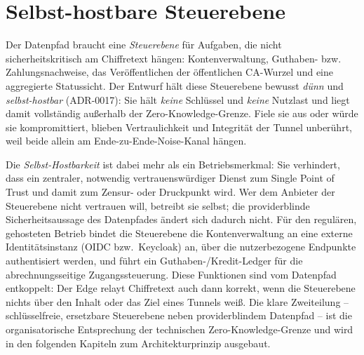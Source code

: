 \section{Selbst-hostbare Steuerebene}
\label{sec:controlplane}

Der Datenpfad braucht eine \emph{Steuerebene} für Aufgaben, die nicht
sicherheitskritisch am Chiffretext hängen: Kontenverwaltung, Guthaben- bzw.
Zahlungsnachweise, das Veröffentlichen der öffentlichen CA-Wurzel und eine
aggregierte Statussicht. Der Entwurf hält diese Steuerebene bewusst
\emph{dünn} und \emph{selbst-hostbar} (ADR-0017): Sie hält \emph{keine}
Schlüssel und \emph{keine} Nutzlast und liegt damit vollständig außerhalb der
Zero-Knowledge-Grenze. Fiele sie aus oder würde sie kompromittiert, blieben
Vertraulichkeit und Integrität der Tunnel unberührt, weil beide allein am
Ende-zu-Ende-Noise-Kanal hängen.

Die \emph{Selbst-Hostbarkeit} ist dabei mehr als ein Betriebsmerkmal: Sie
verhindert, dass ein zentraler, notwendig vertrauenswürdiger Dienst zum
Single Point of Trust und damit zum Zensur- oder Druckpunkt wird. Wer dem
Anbieter der Steuerebene nicht vertrauen will, betreibt sie selbst; die
providerblinde Sicherheitsaussage des Datenpfades ändert sich dadurch nicht.
Für den regulären, gehosteten Betrieb bindet die Steuerebene die
Kontenverwaltung an eine externe Identitätsinstanz (OIDC bzw.\ Keycloak) an,
über die nutzerbezogene Endpunkte authentisiert werden, und führt ein
Guthaben-/Kredit-Ledger für die abrechnungsseitige Zugangssteuerung. Diese
Funktionen sind vom Datenpfad entkoppelt: Der Edge relayt Chiffretext auch dann
korrekt, wenn die Steuerebene nichts über den Inhalt oder das Ziel eines Tunnels
weiß. Die klare Zweiteilung -- schlüsselfreie, ersetzbare Steuerebene neben
providerblindem Datenpfad -- ist die organisatorische Entsprechung der
technischen Zero-Knowledge-Grenze und wird in den folgenden Kapiteln zum
Architekturprinzip ausgebaut.
